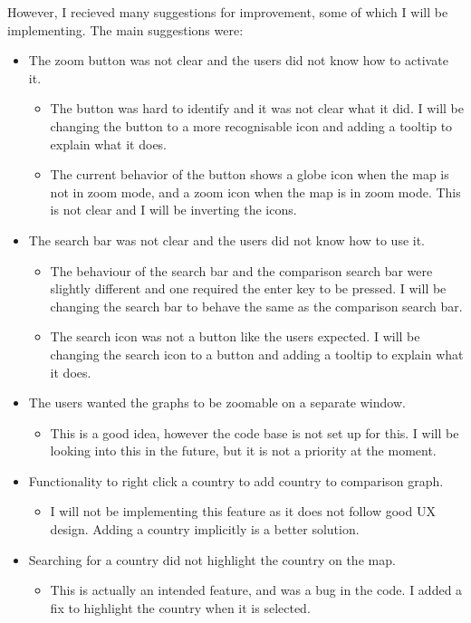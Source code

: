 \documentclass{report}
\begin{document}
However, I recieved many suggestions for improvement, some of which I will be implementing. The main suggestions were:
\begin{itemize}
    \item The zoom button was not clear and the users did not know how to activate it.
    \begin{itemize}
        \item The button was hard to identify and it was not clear what it did. I will be changing the button to a more recognisable icon and adding a tooltip to explain what it does.
        \item The current behavior of the button shows a globe icon when the map is not in zoom mode, and a zoom icon when the map is in zoom mode. This is not clear and I will be inverting the icons.
    \end{itemize}
    \item The search bar was not clear and the users did not know how to use it.
    \begin{itemize}
        \item The behaviour of the search bar and the comparison search bar were slightly different and one required the enter key to be pressed. I will be changing the search bar to behave the same as the comparison search bar.
        \item The search icon was not a button like the users expected. I will be changing the search icon to a button and adding a tooltip to explain what it does.
    \end{itemize}
    \item The users wanted the graphs to be zoomable on a separate window.
    \begin{itemize}
        \item This is a good idea, however the code base is not set up for this. I will be looking into this in the future, but it is not a priority at the moment.
    \end{itemize}
    \item Functionality to right click a country to add country to comparison graph.
    \begin{itemize}
        \item I will not be implementing this feature as it does not follow good UX design. Adding a country implicitly is a better solution.
    \end{itemize}
    \item Searching for a country did not highlight the country on the map.
    \begin{itemize}
        \item This is actually an intended feature, and was a bug in the code. I added a fix to highlight the country when it is selected.
    \end{itemize}
\end{itemize}
\end{document}
